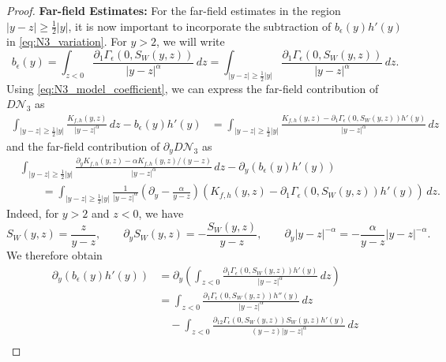 \documentclass[11pt]{amsart}
\theoremstyle{definition}
\theoremstyle{remark}
\numberwithin{equation}{section}
\newcommand{\mc}[1]{\mathcal{#1}}
\begin{document}
\begin{proof}
\textbf{Far-field Estimates:} For the far-field estimates in the region $|y - z| \geq \frac{1}{2}|y|$, it is now important to incorporate the subtraction of $b_\epsilon(y)h'(y)$ in \eqref{eq:N3_variation}. For $y > 2$, we will write
\begin{equation}\label{eq:N3_model_coefficient}b_\epsilon(y) = \int_{z < 0}\frac{\partial_1 \Gamma_\epsilon(0, S_W(y, z))}{|y - z|^\alpha} \, dz = \int_{|y - z| \geq \frac{1}{2}|y|} \frac{\partial_1 \Gamma_\epsilon(0, S_W(y, z))}{|y - z|^\alpha} \, dz.\end{equation}
Using \eqref{eq:N3_model_coefficient}, we can express the far-field contribution of $D\mc{N}_3$ as 
\begin{equation}\label{eq:N3_far_subtraction}
\begin{aligned}
    \int_{|y - z| \geq \frac{1}{2}|y|} \frac{K_{f,h}(y, z)}{|y - z|^\alpha} \, dz - b_\epsilon(y)h'(y) & = \int_{|y - z| \geq \frac{1}{2}|y|} \frac{K_{f,h}(y, z) - \partial_1\Gamma_\epsilon(0, S_W(y, z))h'(y)}{|y - z|^\alpha} \, dz 
\end{aligned}
\end{equation}
and the far-field contribution of $\partial_y D\mc{N}_3$ as 
\begin{equation}\label{eq:N3_far_subtraction_derivative}
\begin{aligned}
    &\int_{|y-z|\geq \frac{1}{2}|y|}
    \frac{\partial_y K_{f,h}(y,z)-\alpha K_{f,h}(y,z)/(y-z)}{|y-z|^\alpha}\,dz
    -\partial_y(b_\epsilon(y)h'(y))\\
    &\qquad=\int_{|y-z|\geq \frac{1}{2}|y|}\frac{1}{|y-z|^\alpha}
    \left(\partial_y-\frac{\alpha}{y-z}\right)
    \left(K_{f,h}(y,z)-\partial_1\Gamma_\epsilon(0,S_W(y,z))h'(y)\right)\,dz.
\end{aligned}
\end{equation}
Indeed, for $y>2$ and $z<0$, we have
\[
    S_W(y,z)=\frac{z}{y-z},\qquad
    \partial_yS_W(y,z)=-\frac{S_W(y,z)}{y-z},\qquad
    \partial_y|y-z|^{-\alpha}=-\frac{\alpha}{y-z}|y-z|^{-\alpha}.
\]
We therefore obtain
\begin{equation}\label{eq:N3_model_coefficient_derivative}
\begin{aligned}
    \partial_y(b_\epsilon(y)h'(y))
    &=\partial_y\left(\int_{z<0}
    \frac{\partial_1\Gamma_\epsilon(0,S_W(y,z))h'(y)}{|y-z|^\alpha}\,dz\right)\\
    &=\int_{z<0}\frac{\partial_1\Gamma_\epsilon(0,S_W(y,z))h''(y)}{|y-z|^\alpha}\,dz\\
    &\quad-\int_{z<0}
    \frac{\partial_{12}\Gamma_\epsilon(0,S_W(y,z))S_W(y,z)h'(y)}{(y-z)|y-z|^\alpha}\,dz\\

\end{aligned}
\end{equation}
\end{proof}
\end{document}
